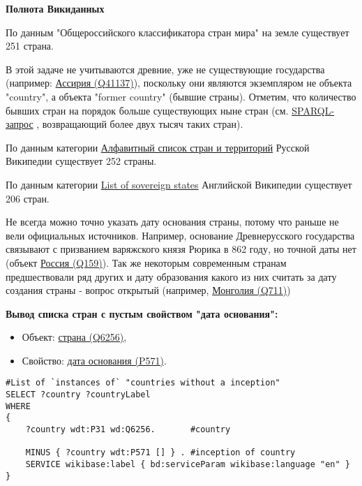 \textbf{Полнота Викиданных}

По данным "Общероссийского классификатора стран мира" на земле существует 251 страна.

В этой задаче не учитываются древние, уже не существующие государства (например: \href{https://www.wikidata.org/wiki/Q41137}{Ассирия (Q41137)}), поскольку они являются экземпляром не объекта "country", а объекта "former country" (бывшие страны). Отметим, что количество бывших стран на порядок больше существующих ныне стран (см. \href{https://query.wikidata.org/#SELECT%20%3Fitem%20%3Flabel%20%3F_image%20WHERE%20%7B%0A%20%20%3Fitem%20wdt%3AP31%20wd%3AQ3024240.%0A%20%20SERVICE%20wikibase%3Alabel%20%7B%0A%20%20%20%20bd%3AserviceParam%20wikibase%3Alanguage%20%22en%22%20.%20%0A%20%20%20%20%3Fitem%20rdfs%3Alabel%20%3Flabel%0A%20%20%7D%0A%20%20%0AOPTIONAL%20%7B%20%3Fitem%20wdt%3AP18%20%3F_image.%20%7D%0A%7D%0A}{SPARQL-запрос} , возвращающий более двух тысяч таких стран).

По данным категории \href{https://www.wikipedia.org/wiki/ru:Алфавитный_список_стран_и_территорий}{Алфавитный список стран и территорий} Русской Википедии существует  252  страны.

По данным категории \href{https://www.wikipedia.org/wiki/en:List_of_sovereign_states}{List of sovereign states} Английской Википедии существует 206 стран.

Не всегда можно точно указать дату основания страны, потому что раньше не вели официальных источников. Например, основание Древнерусского государства связывают с призванием варяжского князя Рюрика в 862 году, но точной даты нет (объект \href{https://www.wikidata.org/wiki/Q159} {Россия (Q159)}). Так же некоторым современным странам предшествовали ряд других и дату образования какого из них считать за дату создания страны - вопрос открытый (например, \href{https://www.wikidata.org/wiki/Q711}{Монголия (Q711)})


\textbf{Вывод списка стран с пустым свойством "дата основания":}

\begin{itemize}
    \item Объект: \href{https://www.wikidata.org/wiki/Q6256}{страна (Q6256)},
    \item Свойство: \href{https://www.wikidata.org/wiki/Property:P571}{дата основания (P571)}.
\end{itemize}

\begin{lstlisting}[language=SPARQL]
#List of `instances of` "countries without a inception" 
SELECT ?country ?countryLabel 
WHERE
{
    ?country wdt:P31 wd:Q6256.       #country
    
    MINUS { ?country wdt:P571 [] } . #inception of country
    SERVICE wikibase:label { bd:serviceParam wikibase:language "en" }
}
\end{lstlisting}

